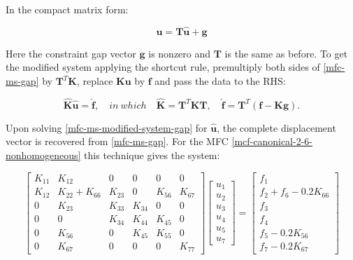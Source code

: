 \documentclass[10pt,b5paper,titlepage]{book}
\newcommand{\m}{\mathbf}
\begin{document}
In the compact matrix form:

\begin{equation}\label{mfc-ms-gap}
    \m{u} = \m{T} \m{\hat{u}} + \m{g}
\end{equation}

Here the constraint gap vector $ \m{g} $ is nonzero and $ \m{T} $ is the same
as before. To get the modified system applying the shortcut rule, premultiply
both sides of \eqref{mfc-ms-gap} by $ \m{T}^T \m{K} $, replace
$ \m{K} \m{u} $ by $ \m{f} $ and pass the data to the RHS:

\begin{equation}\label{mfc-ms-modified-system-gap}
    \m{\hat{K}} \m{\hat{u}} = \m{\hat{f}}, \quad
    in\ which \quad \m{\hat{K}} = \m{T}^T \m{K} \m{T}, \quad
    \m{\hat{f}} = \m{T}^T \left( \m{f} -\m{K} \m{g} \right).
\end{equation}

Upon solving \eqref{mfc-ms-modified-system-gap} for $ \m{\hat{u}} $, the
complete displacement vector is recovered from \eqref{mfc-ms-gap}. For the MFC
\eqref{mcf-canonical-2-6-nonhomogeneous} this technique gives the system:

\begin{equation}
    \begin{bmatrix}
        K_{11} & K_{12} & 0 & 0 & 0 & 0 \\
        K_{12} & K_{22} + K_{66} & K_{23} & 0 & K_{56} & K_{67} \\
        0 & K_{23} & K_{33} & K_{34} & 0 & 0 \\
        0 & 0 & K_{34} & K_{44} & K_{45} & 0 \\
        0 & K_{56} & 0 & K_{45} & K_{55} & 0 \\
        0 & K_{67} & 0 & 0 & 0 & K_{77}
    \end{bmatrix}
    \begin{bmatrix}
        u_1 \\
        u_2 \\
        u_3 \\
        u_4 \\
        u_5 \\
        u_7
    \end{bmatrix}
    = \begin{bmatrix}
        f_1 \\
        f_2 + f_6 - 0.2 K_{66} \\
        f_3 \\
        f_4 \\
        f_5 - 0.2 K_{56} \\
        f_7 - 0.2 K_{67}
    \end{bmatrix}
\end{equation}
\end{document}
